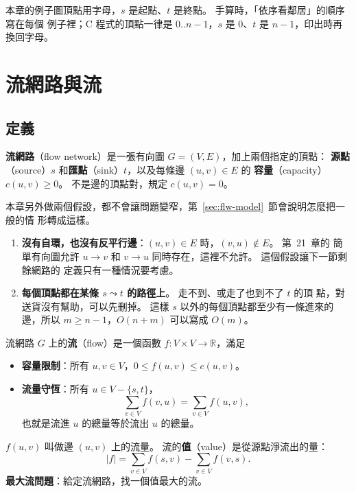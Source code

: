 本章的例子圖頂點用字母，$s$ 是起點、$t$ 是終點。 手算時，「依序看鄰居」的順序寫在每個
例子裡；C 程式的頂點一律是 $0..n-1$，$s$ 是 $0$、$t$ 是 $n - 1$，印出時再換回字母。

\section{流網路與流}
\label{sec:flw-network}

\subsection{定義}

\begin{definition}[流網路]
\label{def:flw-network}
\textbf{流網路}（flow network）是一張有向圖 $G = (V, E)$，加上兩個指定的頂點：
\textbf{源點}（source）$s$ 和\textbf{匯點}（sink）$t$，以及每條邊 $(u, v) \in E$ 的
\textbf{容量}（capacity）$c(u, v) \ge 0$。 不是邊的頂點對，規定 $c(u, v) = 0$。
\end{definition}

本章另外做兩個假設，都不會讓問題變窄，第~\ref{sec:flw-model}~節會說明怎麼把一般的情
形轉成這樣。

\begin{enumerate}
\item \textbf{沒有自環，也沒有反平行邊}：$(u, v) \in E$ 時，$(v, u) \notin E$。 第~21~章的
簡單有向圖允許 $u \to v$ 和 $v \to u$ 同時存在，這裡不允許。 這個假設讓下一節剩餘網路的
定義只有一種情況要考慮。
\item \textbf{每個頂點都在某條 $s \leadsto t$ 的路徑上}。 走不到、或走了也到不了 $t$ 的頂
點，對送貨沒有幫助，可以先刪掉。 這樣 $s$ 以外的每個頂點都至少有一條進來的邊，所以
$m \ge n - 1$，$O(n + m)$ 可以寫成 $O(m)$。
\end{enumerate}

\begin{definition}[流]
\label{def:flw-flow}
流網路 $G$ 上的\textbf{流}（flow）是一個函數 $f : V \times V \to \mathbb{R}$，滿足
\begin{itemize}
\item \textbf{容量限制}：所有 $u, v \in V$，$0 \le f(u, v) \le c(u, v)$。
\item \textbf{流量守恆}：所有 $u \in V - \{s, t\}$，
\[
\sum_{v \in V} f(v, u) = \sum_{v \in V} f(u, v),
\]
也就是流進 $u$ 的總量等於流出 $u$ 的總量。
\end{itemize}
$f(u, v)$ 叫做邊 $(u, v)$ 上的流量。 流的\textbf{值}（value）是從源點淨流出的量：
\[
|f| = \sum_{v \in V} f(s, v) - \sum_{v \in V} f(v, s).
\]
\textbf{最大流問題}：給定流網路，找一個值最大的流。
\end{definition}

